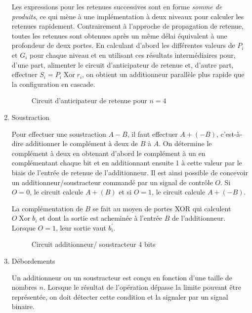 \documentclass[letter, oneside]{book}
\begin{document}
\begin{enumerate}
Les expressions pour les retenues successives sont en forme \emph{somme de
produits}, ce qui mène à une implémentation à deux niveaux pour
calculer les retenues rapidement. Contrairement à l'approche de
propagation de retenue, toutes les retenues sont obtenues après un
même délai équivalent à une profondeur de deux portes.  En calculant
d'abord les différentes valeurs de \(P_i\) et \(G_i\) pour chaque
niveau et en utilisant ces résultats intermédiaires pour, d'une part,
alimenter le circuit d'anticipateur de retenue et, d'autre part,
effectuer \(S_i = P_i  \operatorname{Xor} r_i\), on obtient un additionneur parallèle
plus rapide que la configuration en cascade.

\begin{figure}[htbp]
\centering

\caption{\label{fig:orge084d0d}Circuit d'anticipateur de retenue pour \(n= 4\)}
\end{figure}


\item Soustraction
\label{sec:org70e4a2b}

Pour effectuer une soustraction \(A - B\), il faut effectuer \(A +
(-B)\), c'est-à-dire additionner le complément à deux de \(B\) à
\(A\). On détermine le complément à deux en obtenant d'abord le
complément à un en complémentant chaque bit et en additionnant ensuite
1 à cette valeur par le biais de l'entrée de retenue de l'additionneur. Il
est ainsi possible de concevoir un additionneur/soustracteur commandé
par un signal de contrôle \(O\). Si \(O=0\), le circuit calcule \(A +
(B)\) et si \(O=1\), le circuit calcule \(A + (-B)\).

La complémentation de \(B\) se fait au moyen de portes XOR qui
calculent \(O \operatorname{Xor} b_i\) et dont la sortie est acheminée
à l'entrée \(B\) de l'additionneur. Lorsque \(O=1\), leur sortie vaut
\(b_i^\prime\).

\begin{figure}[htbp]
\centering

\caption{\label{fig:org900bf53}Circuit additionneur/ soustracteur 4 bits}
\end{figure}

\item Débordements
\label{sec:org783ebf0}

Un additionneur ou un soustracteur est conçu en fonction d'une
taille de nombres \(n\). Lorsque le résultat de l'opération dépasse la
limite pouvant être représentée, on doit détecter cette condition et
la signaler par un signal binaire.


\end{enumerate}
\end{document}
